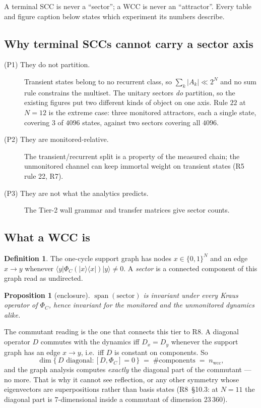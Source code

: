 \documentclass[11pt]{article}
\newcommand{\wcc}{\mathrm{wcc}}
\theoremstyle{plain}
\newtheorem{proposition}{Proposition}
\theoremstyle{definition}
\newtheorem{definition}{Definition}
\begin{document}
\noindent A terminal SCC is never a ``sector''; a WCC is never an ``attractor''.
Every table and figure caption below states which experiment its numbers
describe.

\subsection{Why terminal SCCs cannot carry a sector axis}

\begin{description}
\item[(P1) They do not partition.] Transient states belong to no recurrent
  class, so $\sum_k|A_k|\ll 2^N$ and no sum rule constrains the multiset. The
  unitary sectors \emph{do} partition, so the existing figures put two
  different kinds of object on one axis. Rule $22$ at $N=12$ is the extreme
  case: three monitored attractors, each a single state, covering $3$ of
  $4096$ states, against two sectors covering all $4096$.
\item[(P2) They are monitored-relative.] The transient/recurrent split is a
  property of the measured chain; the unmonitored channel can keep immortal
  weight on transient states (R5 rule 22, R7).
\item[(P3) They are not what the analytics predicts.] The Tier-2 wall grammar
  and transfer matrices give sector counts.
\end{description}

\subsection{What a WCC is}

\begin{definition}
The one-cycle support graph has nodes $x\in\{0,1\}^N$ and an edge $x\to y$
whenever $\langle y|\Phi_C(|x\rangle\langle x|)|y\rangle\neq0$. A \emph{sector}
is a connected component of this graph read as undirected.
\end{definition}

\begin{proposition}[enclosure]
$\operatorname{span}(\text{sector})$ is invariant under every Kraus operator of
$\Phi_C$, hence invariant for the monitored and the unmonitored dynamics alike.
\end{proposition}

\noindent The commutant reading is the one that connects this tier to R8. A
diagonal operator $D$ commutes with the dynamics iff $D_x=D_y$ whenever the
support graph has an edge $x\to y$, i.e.\ iff $D$ is constant on components. So
\begin{equation}
\dim\{\,D \text{ diagonal}:[D,\Phi_C]=0\,\}\;=\;\#\text{components}\;=\;n_\wcc,
\label{eq:diagcommutant}
\end{equation}
and the graph analysis computes \emph{exactly} the diagonal part of the
commutant --- no more. That is why it cannot see reflection, or any other
symmetry whose eigenvectors are superpositions rather than basis states
(R8~\S10.3: at $N=11$ the diagonal part is $7$-dimensional inside a commutant of
dimension $23\,360$).
\end{document}
